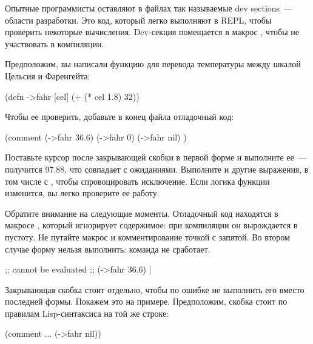 Опытные программисты оставляют в файлах так называемые dev sections~--- области разработки. Это код, который легко выполняют в REPL, чтобы проверить некоторые вычисления. Dev-секция помещается в макрос , чтобы не участвовать в компиляции.

Предположим, вы написали функцию  для перевода температуры между шкалой Цельсия и Фаренгейта:

\begin{english}
  \begin{clojure}
(defn ->fahr [cel]
  (+ (* cel 1.8) 32))
  \end{clojure}
\end{english}

Чтобы ее проверить, добавьте в конец файла отладочный код:

\begin{english}
  \begin{clojure}
(comment
  (->fahr 36.6)
  (->fahr 0)
  (->fahr nil)
  )
  \end{clojure}
\end{english}

Поставьте курсор после закрывающей скобки в первой форме и выполните ее~--- получится 97.88, что совпадает с ожиданиями. Выполните и другие выражения, в том числе с , чтобы спровоцировать исключение. Если логика функции изменится, вы легко проверите ее работу.

Обратите внимание на следующие моменты. Отладочный код находятся в макросе , который игнорирует содержимое: при компиляции он вырождается в пустоту. Не путайте макрос  и комментирование точкой с запятой. Во втором случае форму нельзя выполнить: команда  не сработает.

\begin{english}
  \begin{clojure}
;; cannot be evaluated
;; (->fahr 36.6) |
  \end{clojure}
\end{english}

Закрывающая скобка  стоит отдельно, чтобы по ошибке не выполнить его вместо последней формы. Покажем это на примере. Предположим, скобка стоит по правилам Lisp-синтаксиса на той же строке:

\begin{english}
  \begin{clojure}
(comment
  ...
  (->fahr nil))
  \end{clojure}
\end{english}

